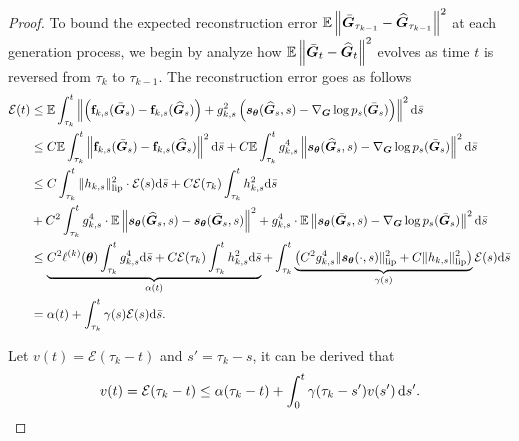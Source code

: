 \begin{proof}
To bound the expected reconstruction error $\mathbb{E}\left\|\bar{\bm{G}}_{\tau_{k-1}}-\widehat{\bm{G}}_{\tau_{k-1}}\right\|^2$ at each generation process, we begin by analyze how $\mathbb{E}\left\|\bar{\bm{G}}_t-\widehat{\bm{G}}_t\right\|^2$ evolves as time $t$ is reversed from $\tau_k$ to $\tau_{k-1}$. 
The reconstruction error goes as follows
\begin{equation}
\begin{aligned}
\mathcal{E}(t)
&\leq \mathbb{E}\int_{\tau_k}^t\left\|\left(\mathbf{f}_{k,s}(\bar{\bm{G}}_s)-\mathbf{f}_{k,s}(\widehat{\bm{G}}_{s})\right)+g_{k,s}^2 \left(\bm{s}_{\bm{\theta}}(\widehat{\bm{G}}_{s},s)-\nabla_{\bm{G}}\log p_{s}(\bar{\bm{G}}_{s})\right)\right\|^2\mathrm{d}\bar{s} \\ 
&\leq C\mathbb{E}\int_{\tau_k}^t\left\|\mathbf{f}_{k,s}(\bar{\bm{G}}_{s})-\mathbf{f}_{k,s}(\widehat{\bm{G}}_{s})\right\|^2 \mathrm{d}\bar{s} 
+ C\mathbb{E}\int_{\tau_k}^t g_{k,s}^4\left\|\bm{s}_{\bm{\theta}}(\widehat{\bm{G}}_s,s)-\nabla_{\bm{G}}\log p_s(\bar{\bm{G}}_s)\right\|^2\mathrm{d}\bar{s} \\ 
&\leq C\int_{\tau_k}^t\|h_{k,s}\|_{\mathrm{lip}}^2\cdot \mathcal{E}(s) \mathrm{d}\bar{s} 
+ C \mathcal{E}(\tau_k) \int_{\tau_k}^t h_{k,s}^2 \mathrm{d}\bar{s}  \\
&+ C^2 \int_{\tau_k}^t g_{k,s}^4 \cdot\mathbb{E}\left\|\bm{s}_{\bm{\theta}}(\widehat{\bm{G}}_{s},s)-\bm{s}_{\bm{\theta}}(\bar{\bm{G}}_{s},s)\right\|^2   
+g_{k,s}^4\cdot\mathbb{E}\left\|\bm{s}_{\bm{\theta}}(\bar{\bm{G}}_s,s)-\nabla_{\bm{G}}\log p_s(\bar{\bm{G}}_s)\right\|^2\mathrm{d}\bar{s}  \\
&\leq \underbrace{C^2 \ell^{(k)}(\bm{\theta}) \int_{\tau_k}^t g_{k,s}^4\mathrm{d}\bar{s} 
+ C \mathcal{E}(\tau_k) \int_{\tau_k}^t h_{k,s}^2   \mathrm{d}\bar{s}}_{\alpha(t)}  
+\int_{\tau_k}^t \underbrace{\left( C^2 g_{k,s}^4 \|\bm{s}_{\bm{\theta}}(\cdot,s)\|_{\mathrm{lip}}^2 
+C\|h_{k,s}\|_{\mathrm{lip}}^2 \right)}_{\gamma(s)}  \mathcal{E}(s)  \mathrm{d}\bar{s} \\
& = \alpha(t) + \int_{\tau_k}^t \gamma(s) \mathcal{E}(s)  \mathrm{d}\bar{s}.
\end{aligned}
\end{equation}



Let $v(t)=\mathcal{E}(\tau_k-t)$ and $s'=\tau_k-s$, it can be derived that
\begin{equation}
    v(t) = \mathcal{E}(\tau_k-t) \leq \alpha(\tau_k-t) + \int _0 ^t \gamma(\tau_k - s')v(s')\mathop{}\!\mathrm{d} s'.
\end{equation}


\end{proof}
